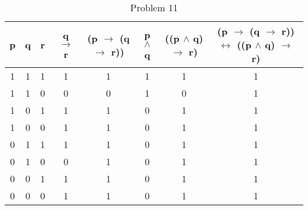 \documentclass{article}
\begin{document}
\begin{table}[h]
\centering
\caption{Problem 11}
\label{my-label}
\begin{tabular}{|c|c|c|c|c|c|c|c|}
\hline
p & q & r & q $\rightarrow$ r & (p $\rightarrow$ (q $\rightarrow$ r)) & p $\wedge$  q & ((p $\wedge$  q) $\rightarrow$ r) & (p $\rightarrow$ (q $\rightarrow$ r)) $\leftrightarrow$ ((p $\wedge$  q) $\rightarrow$ r) \\ \hline
1 & 1 & 1 & 1                & 1                                   & 1                     & 1                                        & 1                                                                                                  \\ \hline
1 & 1 & 0 & 0                & 0                                   & 1                     & 0                                        & 1                                                                                                  \\ \hline
1 & 0 & 1 & 1                & 1                                   & 0                     & 1                                        & 1                                                                                                  \\ \hline
1 & 0 & 0 & 1                & 1                                   & 0                     & 1                                        & 1                                                                                                  \\ \hline
0 & 1 & 1 & 1                & 1                                   & 0                     & 1                                        & 1                                                                                                  \\ \hline
0 & 1 & 0 & 0                & 1                                   & 0                     & 1                                        & 1                                                                                                  \\ \hline
0 & 0 & 1 & 1                & 1                                   & 0                     & 1                                        & 1                                                                                                  \\ \hline
0 & 0 & 0 & 1                & 1                                   & 0                     & 1                                        & 1                                                                                                  \\ \hline
\end{tabular}
\end{table}
\end{document}
